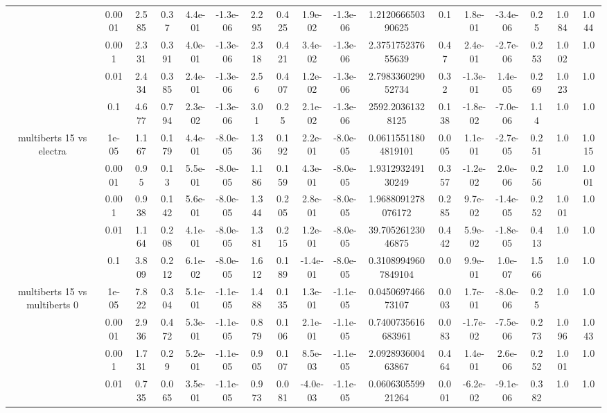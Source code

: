 \begin{tabular}{|c|c|c|c|c|c|c|c|c|c|c|c|c|c|c|c|c|}
 & 0.0001 & 2.585 & 0.37 & 4.4e-01 & -1.3e-06 & 2.295 & 0.425 & 1.9e-02 & -1.3e-06 & 1.212066650390625 & 0.1 & 1.8e-01 & -3.4e-06 & 0.25 & 1.084 & 1.044 \\
 & 0.001 & 2.331 & 0.391 & 4.0e-01 & -1.3e-06 & 2.318 & 0.421 & 3.4e-02 & -1.3e-06 & 2.375175237655639 & 0.47 & 2.4e-01 & -2.7e-06 & 0.253 & 1.002 & 1.0 \\
 & 0.01 & 2.434 & 0.385 & 2.4e-01 & -1.3e-06 & 2.56 & 0.407 & 1.2e-02 & -1.3e-06 & 2.798336029052734 & 0.32 & -1.3e-01 & 1.4e-05 & 0.269 & 1.023 & 1.0 \\
 & 0.1 & 4.677 & 0.794 & 2.3e-02 & -1.3e-06 & 3.01 & 0.25 & 2.1e-02 & -1.3e-06 & 2592.20361328125 & 0.138 & -1.8e-02 & -7.0e-06 & 1.14 & 1.0 & 1.0 \\
\hline
\multirow{5}{*}{multiberts 15 vs electra } & 1e-05 & 1.167 & 0.179 & 4.4e-01 & -8.0e-05 & 1.336 & 0.192 & 2.2e-01 & -8.0e-05 & 0.06115511804819101 & 0.005 & 1.1e-01 & -2.7e-05 & 0.251 & 1.0 & 1.015 \\
 & 0.0001 & 0.95 & 0.13 & 5.5e-01 & -8.0e-05 & 1.186 & 0.159 & 4.3e-01 & -8.0e-05 & 1.931293249130249 & 0.357 & -1.2e-02 & 2.0e-06 & 0.256 & 1.0 & 1.001 \\
 & 0.001 & 0.938 & 0.142 & 5.6e-01 & -8.0e-05 & 1.344 & 0.205 & 2.8e-01 & -8.0e-05 & 1.9688091278076172 & 0.285 & 9.7e-02 & -1.4e-05 & 0.252 & 1.001 & 1.0 \\
 & 0.01 & 1.164 & 0.208 & 4.1e-01 & -8.0e-05 & 1.381 & 0.215 & 1.2e-01 & -8.0e-05 & 39.70526123046875 & 0.442 & 5.9e-02 & -1.8e-05 & 0.413 & 1.0 & 1.0 \\
 & 0.1 & 3.809 & 0.212 & 6.1e-02 & -8.0e-05 & 1.612 & 0.189 & -1.4e-01 & -8.0e-05 & 0.31089949607849104 & 0.0 & 9.9e-01 & 1.0e-07 & 1.566 & 1.0 & 1.0 \\
\hline
\multirow{5}{*}{multiberts 15 vs multiberts 0} & 1e-05 & 7.822 & 0.304 & 5.1e-01 & -1.1e-05 & 1.488 & 0.135 & 1.3e-01 & -1.1e-05 & 0.045069746673107 & 0.003 & 1.7e-01 & -8.0e-06 & 0.25 & 1.0 & 1.0 \\
 & 0.0001 & 2.936 & 0.472 & 5.3e-01 & -1.1e-05 & 0.879 & 0.106 & 2.1e-01 & -1.1e-05 & 0.7400735616683961 & 0.083 & -1.7e-02 & -7.5e-06 & 0.273 & 1.096 & 1.043 \\
 & 0.001 & 1.731 & 0.29 & 5.2e-01 & -1.1e-05 & 0.905 & 0.107 & 8.5e-03 & -1.1e-05 & 2.092893600463867 & 0.464 & 1.4e-01 & 2.6e-06 & 0.252 & 1.001 & 1.0 \\
 & 0.01 & 0.735 & 0.065 & 3.5e-01 & -1.1e-05 & 0.973 & 0.081 & -4.0e-03 & -1.1e-05 & 0.060630559921264 & 0.001 & -6.2e-02 & -9.1e-06 & 0.382 & 1.0 & 1.0 \\

\end{tabular}
